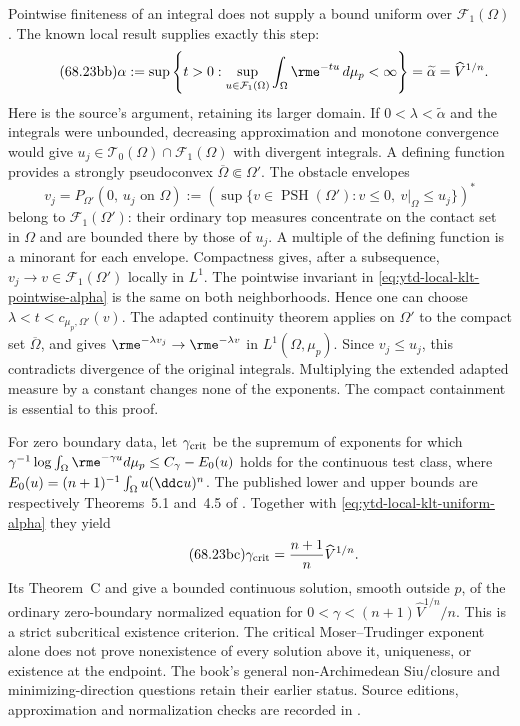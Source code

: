 Pointwise finiteness of an integral does not supply a bound uniform
over $\mathcal F_1(\Omega)$. The known local result
\cite[Theorem~8.1]{DarvasZhang26KltV2} supplies exactly this step:
\[
\tag{68.23bb}\label{eq:ytd-local-klt-uniform-alpha}
 \alpha
 :=\sup\left\{t>0:
       \sup_{u\in\mathcal F_1(\Omega)}
                    \int_\Omega\rme^{-tu}\,d\mu_p<\infty\right\}
 =\widetilde\alpha=\widehat V^{1/n}.
\]
Here is the source's argument, retaining its larger domain. If
$0<\lambda<\widetilde\alpha$ and the integrals were unbounded,
decreasing approximation and monotone convergence would give
$u_j\in\mathcal T_0(\Omega)\cap\mathcal F_1(\Omega)$ with divergent
integrals. A defining function provides a strongly pseudoconvex
$\overline\Omega\Subset\Omega'$. The obstacle envelopes
\[
 v_j=P_{\Omega'}(0,\,u_j\text{ on }\Omega)
 :=\left(\sup\{v\in\operatorname{PSH}(\Omega'):
                   v\leq0,\ v|_\Omega\leq u_j\}\right)^*
\]
belong to $\mathcal F_1(\Omega')$: their ordinary top measures
concentrate on the contact set in $\Omega$ and are bounded there
by those of $u_j$. A multiple of the defining function is a
minorant for each envelope. Compactness gives, after a subsequence,
$v_j\to v\in\mathcal F_1(\Omega')$ locally in $L^1$.
The pointwise invariant in \eqref{eq:ytd-local-klt-pointwise-alpha}
is the same on both neighborhoods. Hence one can choose
$\lambda<t<c_{\mu_p,\Omega'}(v)$.
The adapted continuity theorem applies on $\Omega'$ to the compact
set $\overline\Omega$, and gives
$\rme^{-\lambda v_j}\to\rme^{-\lambda v}$ in $L^1(\Omega,\mu_p)$.
Since $v_j\leq u_j$, this contradicts divergence of the original
integrals. Multiplying the extended adapted measure by a constant
changes none of the exponents. The compact containment is essential
to this proof.

For zero boundary data, let $\gamma_{\rm crit}$ be the supremum
of exponents for which
$\gamma^{-1}\log\int_\Omega\rme^{-\gamma u}d\mu_p
\leq C_\gamma-E_0(u)$ holds for the continuous test class,
where $E_0(u)=(n+1)^{-1}\int_\Omega u(\ddc u)^n$.
The published lower and upper bounds are respectively Theorems~5.1
and~4.5 of \cite{GuedjTrusiani25LocalPublished}. Together with
\eqref{eq:ytd-local-klt-uniform-alpha} they yield
\[
\tag{68.23bc}\label{eq:ytd-local-klt-critical-exponent}
 \gamma_{\rm crit}
   =\frac{n+1}{n}\widehat V^{1/n}.
\]
Its Theorem~C and \cite[Corollary~1.7]{DarvasZhang26KltV2} give a
bounded continuous solution, smooth outside $p$, of the ordinary
zero-boundary normalized equation for
$0<\gamma<(n+1)\widehat V^{1/n}/n$. This is a strict subcritical
existence criterion. The critical Moser--Trudinger exponent alone
does not prove nonexistence of every solution above it, uniqueness,
or existence at the endpoint. The book's general non-Archimedean
Siu/closure and minimizing-direction questions retain their earlier
status. Source editions, approximation and normalization checks are
recorded in .

